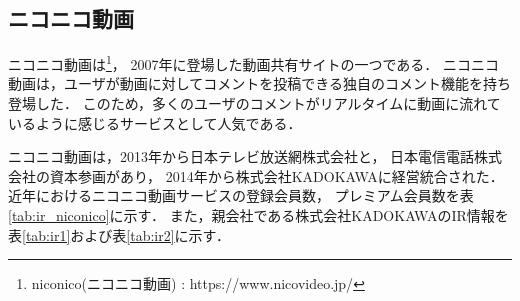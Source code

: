 \documentclass[submit,techrep,noauthor]{ipsj}
\begin{document}
\subsection{ニコニコ動画}
ニコニコ動画は\footnote{niconico(ニコニコ動画) : https://www.nicovideo.jp/}，
2007年に登場した動画共有サイトの一つである．
%
ニコニコ動画は，ユーザが動画に対してコメントを投稿できる独自のコメント機能を持ち登場した．
このため，多くのユーザのコメントがリアルタイムに動画に流れているように感じるサービスとして人気である．

\newpage
ニコニコ動画は，2013年から日本テレビ放送網株式会社と，
日本電信電話株式会社の資本参画があり，
2014年から株式会社KADOKAWAに経営統合された．
%
近年におけるニコニコ動画サービスの登録会員数，
プレミアム会員数を表\ref{tab:ir_niconico}に示す．
また，親会社である株式会社KADOKAWAのIR情報を表\ref{tab:ir1}および表\ref{tab:ir2}に示す．
\end{document}
